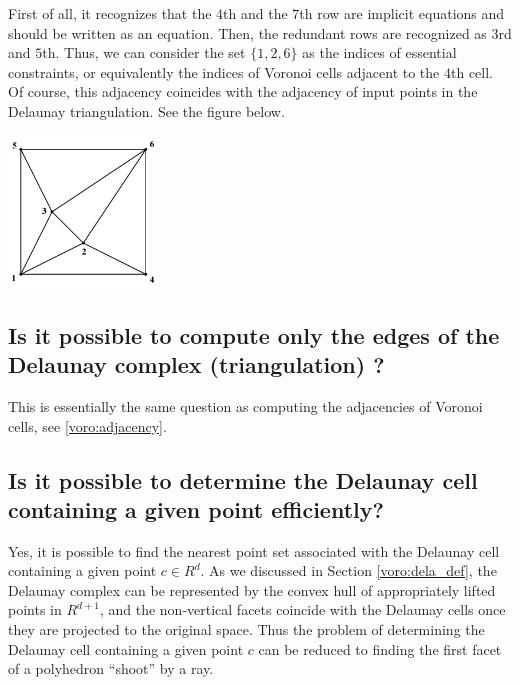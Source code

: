 \documentclass[a4paper,12pt]{article}
\begin{document}
\begin{small}
First of all, it recognizes that the $4$th and the $7$th row
are implicit equations and should be written as an equation.
Then, the redundant rows are recognized as $3$rd and $5$th.  Thus, we can
consider the set $\{1, 2, 6\}$ as the indices of essential constraints, or
equivalently the indices of Voronoi cells adjacent to the $4$th
cell.  Of course, this adjacency coincides with the adjacency
of input points in the Delaunay triangulation.
See the figure below.

\bigskip
\begin{center}
\includegraphics[height=40mm]{vtest_draw_de}
\end{center}


\end{small}

\subsection{Is it possible to compute only the edges of the Delaunay complex
(triangulation) ?} \label{voro:de_adjacency}

This is essentially the same question as computing
the adjacencies of Voronoi cells, see \ref{voro:adjacency}.

\subsection{Is it possible to determine the Delaunay cell containing
a given point efficiently?}
\label{dela:cellbylp}

Yes, it is possible to find the nearest point set associated
with the Delaunay cell containing a given point $c\in R^d$.
As we discussed in Section \ref{voro:dela_def}, the Delaunay
complex can be represented by the convex hull of appropriately
lifted points in $R^{d+1}$, and the non-vertical facets coincide with
the Delaunay cells once they are projected to the original space.
Thus the problem of determining the Delaunay cell containing a given
point $c$ can be reduced to finding the first facet of a polyhedron
``shoot'' by a ray.
\end{document}
